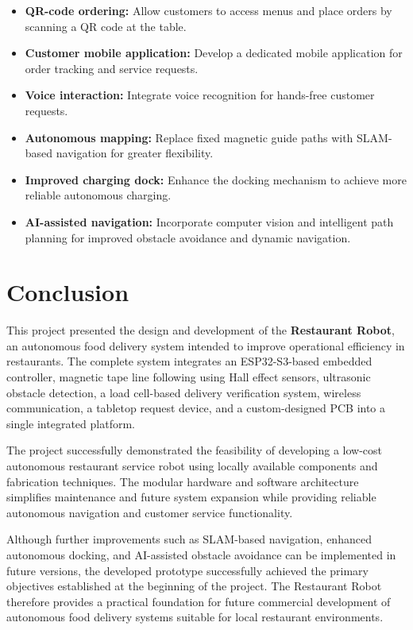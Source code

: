\documentclass[12pt,a4paper]{article}
\begin{document}
\begin{itemize}[nosep]
    \item \textbf{QR-code ordering:} Allow customers to access menus
    and place orders by scanning a QR code at the table.

    \item \textbf{Customer mobile application:} Develop a dedicated
    mobile application for order tracking and service requests.

    \item \textbf{Voice interaction:} Integrate voice recognition for
    hands-free customer requests.

    \item \textbf{Autonomous mapping:} Replace fixed magnetic guide
    paths with SLAM-based navigation for greater flexibility.

    \item \textbf{Improved charging dock:} Enhance the docking
    mechanism to achieve more reliable autonomous charging.

    \item \textbf{AI-assisted navigation:} Incorporate computer vision
    and intelligent path planning for improved obstacle avoidance and
    dynamic navigation.
\end{itemize}

\section{Conclusion}

This project presented the design and development of the
\textbf{Restaurant Robot}, an autonomous food delivery system intended
to improve operational efficiency in restaurants. The complete system
integrates an ESP32-S3-based embedded controller, magnetic tape line
following using Hall effect sensors, ultrasonic obstacle detection, a
load cell-based delivery verification system, wireless communication,
a tabletop request device, and a custom-designed PCB into a single
integrated platform.

The project successfully demonstrated the feasibility of developing a
low-cost autonomous restaurant service robot using locally available
components and fabrication techniques. The modular hardware and
software architecture simplifies maintenance and future system
expansion while providing reliable autonomous navigation and customer
service functionality.

Although further improvements such as SLAM-based navigation, enhanced
autonomous docking, and AI-assisted obstacle avoidance can be
implemented in future versions, the developed prototype successfully
achieved the primary objectives established at the beginning of the
project. The Restaurant Robot therefore provides a practical
foundation for future commercial development of autonomous food
delivery systems suitable for local restaurant environments.
\end{document}
